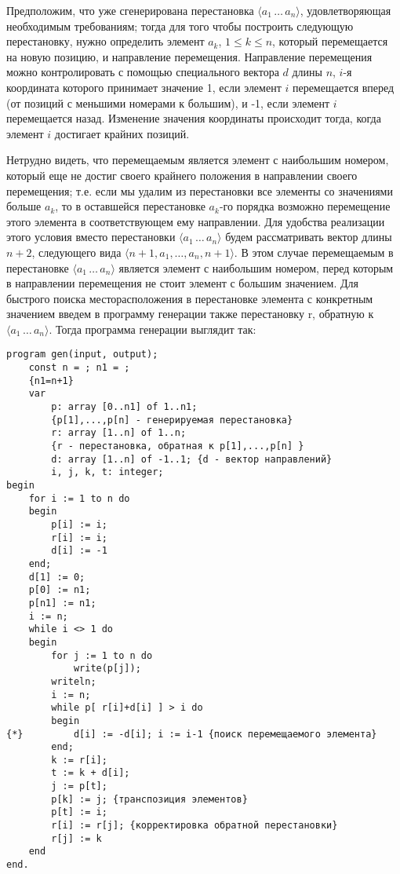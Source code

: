 \documentclass[12pt,a4paper]{article}
\theoremstyle{plain}
\theoremstyle{definition}
\theoremstyle{remark}
\begin{document}
Предположим, что уже сгенерирована перестановка $\langle a_1\,\ldots\,a_n \rangle$, удовлетворяющая необходимым требованиям; тогда для того чтобы построить следующую перестановку, нужно определить элемент $a_k$, $1\le k\le n$, который перемещается на новую позицию, и направление перемещения. Направление перемещения можно контролировать с помощью специального вектора $d$ длины $n$, $i$-я координата которого принимает значение 1, если элемент $i$ перемещается вперед (от позиций с меньшими номерами к большим), и -1, если элемент $i$ перемещается назад. Изменение значения координаты происходит тогда, когда элемент $i$ достигает крайних позиций.

Нетрудно видеть, что перемещаемым является элемент с наибольшим номером, который еще не достиг своего крайнего положения в направлении своего перемещения; т.е. если мы удалим из перестановки все элементы со значениями больше $a_k$, то в оставшейся перестановке $a_k$-го порядка возможно перемещение этого элемента в соответствующем ему направлении. Для удобства реализации этого условия вместо перестановки $\langle a_1\,\ldots\,a_n\rangle$ будем рассматривать вектор длины $n+2$, следующего вида $\langle n+1,a_1,\ldots,a_n,n+1\rangle$. В этом случае перемещаемым в перестановке $\langle a_1\,\ldots\,a_n\rangle$ является элемент с наибольшим номером, перед которым в направлении перемещения не стоит элемент с большим значением. Для быстрого поиска месторасположения в перестановке элемента с конкретным значением
введем в программу генерации также перестановку r, обратную к $\langle a_1\,\ldots\,a_n\rangle$. Тогда программа генерации выглядит так:

\begin{verbatim}
program gen(input, output);
    const n = ; n1 = ;
    {n1=n+1}
    var
        p: array [0..n1] of 1..n1;
        {p[1],...,p[n] - генерируемая перестановка}
        r: array [1..n] of 1..n;
        {r - перестановка, обратная к p[1],...,p[n] }
        d: array [1..n] of -1..1; {d - вектор направлений}
        i, j, k, t: integer;
begin
    for i := 1 to n do
    begin
        p[i] := i;
        r[i] := i;
        d[i] := -1
    end;
    d[1] := 0;
    p[0] := n1;
    p[n1] := n1;
    i := n;
    while i <> 1 do
    begin
        for j := 1 to n do
            write(p[j]);
        writeln;
        i := n;
        while p[ r[i]+d[i] ] > i do
        begin
{*}         d[i] := -d[i]; i := i-1 {поиск перемещаемого элемента}
        end;
        k := r[i];
        t := k + d[i];
        j := p[t];
        p[k] := j; {транспозиция элементов}
        p[t] := i;
        r[i] := r[j]; {корректировка обратной перестановки}
        r[j] := k
    end
end.
\end{verbatim}
\end{document}

